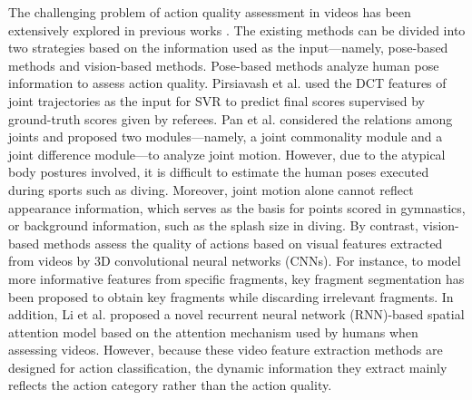 \documentclass[sigconf]{acmart}
\begin{document}
The challenging problem of action quality assessment in videos has been extensively explored in previous works \cite{pirsiavash2014assessing,li2018scoringnet,li2018end,xu2019learning,parmar2017learning,bertasius2017baller,zia2018video,doughty2018s,doughty2019pros,parmar2016measuring,zia2015automated}. The existing methods can be divided into two strategies based on the information used as the input---namely, pose-based methods and vision-based methods. Pose-based methods \cite{pirsiavash2014assessing,pan2019action} analyze human pose information to assess action quality. Pirsiavash et al. \cite{pirsiavash2014assessing} used the DCT features of joint trajectories as the input for SVR to predict final scores supervised by ground-truth scores given by referees. Pan et al. \cite{pan2019action} considered the relations among joints and proposed two modules---namely, a joint commonality module and a joint difference module---to analyze joint motion. However, due to the atypical body postures involved, it is difficult to estimate the human poses executed during sports such as diving. Moreover, joint motion alone cannot reflect appearance information, which serves as the basis for points scored in gymnastics, or background information, such as the splash size in diving. By contrast, vision-based methods \cite{li2018scoringnet,li2018end,xu2019learning,parmar2017learning,doughty2019pros} assess the quality of actions based on visual features extracted from videos by 3D convolutional neural networks (CNNs). For instance, to model more informative features from specific fragments, key fragment segmentation \cite{li2018scoringnet} has been proposed to obtain key fragments while discarding irrelevant fragments. In addition, Li et al. \cite{li2019manipulation} proposed a novel recurrent neural network (RNN)-based spatial attention model based on the attention mechanism used by humans when assessing videos. However, because these video feature extraction methods are designed for action classification, the dynamic information they extract mainly reflects the action category rather than the action quality.
\end{document}
